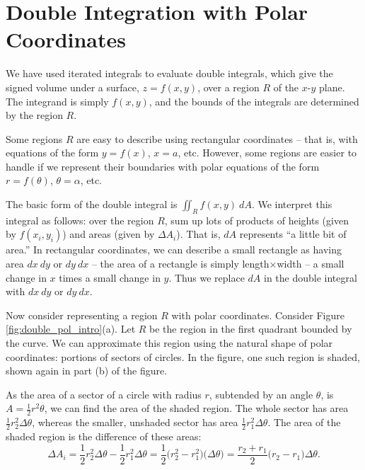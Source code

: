 \section{Double Integration with Polar Coordinates}\label{sec:double_int_polar}

We have used iterated integrals to evaluate double integrals, which give the signed volume under a surface, $z=f(x,y)$, over a region $R$ of the $x$-$y$ plane. The integrand is simply $f(x,y)$, and the bounds of the integrals are determined by the region $R$.

Some regions $R$ are easy to describe using rectangular coordinates -- that is, with equations of the form $y=f(x)$, $x=a$, etc. However, some regions are easier to handle if we represent their boundaries with polar equations of the form $r=f(\theta)$, $\theta = \alpha$, etc. 

The basic form of the double integral is $\iint_R f(x,y)\ dA$. We interpret this integral as follows: over the region $R$, sum up lots of products of heights (given by $f(x_i,y_i)$) and areas (given by $\Delta A_i$). That is, $dA$ represents ``a little bit of area.'' In rectangular coordinates, we can describe a small rectangle as having area $dx\ dy$ or $dy\ dx$ -- the area of a rectangle is simply length$\times$width -- a small change in $x$ times a small change in $y$. Thus we replace $dA$ in the double integral with $dx\ dy$ or $dy\ dx$.

Now consider representing a region $R$ with polar coordinates. Consider Figure \ref{fig:double_pol_intro}(a). Let $R$ be the region in the first quadrant bounded by the curve. We can approximate this region using the natural shape of polar coordinates: portions of sectors of circles. In the figure, one such region is shaded, shown again in part (b) of the figure.

As the area of a sector of a circle with radius $r$, subtended by an angle $\theta$, is $A = \frac12r^2\theta$, we can find the area of the shaded region. The whole sector has area $\frac12r_2^2\Delta \theta$, whereas the smaller, unshaded sector has area $\frac12r_1^2\Delta \theta$. The area of the shaded region is the difference of these areas:
$$\Delta A_i = \frac12r_2^2\Delta\theta-\frac12r_1^2\Delta\theta = \frac12\big(r_2^2-r_1^2\big)\big(\Delta\theta\big) = \frac{r_2+r_1}{2}\big(r_2-r_1\big)\Delta\theta.$$

